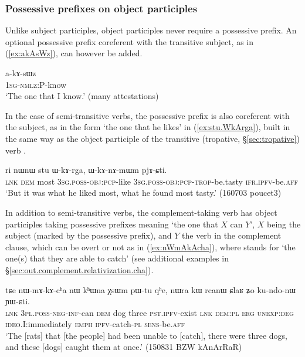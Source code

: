 \subsubsection{Possessive prefixes on object participles}  \label{sec:object.participle.possessive} 
Unlike subject participles, object participles never require a possessive prefix. An optional possessive prefix coreferent with the transitive subject, as in (\ref{ex:akAsWz}), can however be added.
  
  \begin{exe}
\ex \label{ex:akAsWz}
\gll a-kɤ-sɯz    \\
   \textsc{1sg}-\textsc{nmlz}:P-know \\
 \glt  `The one that I know.' (many attestations)
 \end{exe}

In the case of semi-transitive verbs, the possessive prefix is also coreferent with the subject, as in the form  `the one that he likes' in (\ref{ex:stu.WkArga}), built in the same way as the object participle of the transitive (tropative, §\ref{sec:tropative}) verb .

\begin{exe}
\ex \label{ex:stu.WkArga}
\gll ri nɯnɯ stu ɯ-kɤ-rga, ɯ-kɤ-nɤ-mɯm pjɤ-ɕti. \\
\textsc{lnk} \textsc{dem}  most \textsc{3sg}.\textsc{poss}-\textsc{obj}:\textsc{pcp}-like \textsc{3sg}.\textsc{poss}-\textsc{obj}:\textsc{pcp}-\textsc{trop}-be.tasty \textsc{ifr}.\textsc{ipfv}-be.\textsc{aff} \\
\glt `But it was what he liked most, what he found most tasty.' (160703 poucet3) 
\end{exe}

In addition to semi-transitive verbs, the com\-ple\-ment-taking verb  has object participles taking possessive prefixes meaning `the one that $X$ can $Y$', $X$ being the subject (marked by the possessive prefix), and $Y$ the verb in the complement clause, which can be overt or not as in (\ref{ex:nWmAkAcha}), where  stands for  `the one(s) that they are able to catch' (see additional examples in §\ref{sec:out.complement.relativization.cha}).
 
\begin{exe}
\ex  \label{ex:nWmAkAcha}
\gll tɕe nɯ-mɤ-kɤ-cʰa nɯ kʰɯna χsɯm pɯ-tu qʰe, nɯra kɯ rcanɯ ɕlaʁ ʑo ku-ndo-nɯ ɲɯ-ɕti. \\
\textsc{lnk} \textsc{3pl}.\textsc{poss}-\textsc{neg}-\textsc{inf}-can \textsc{dem} dog three \textsc{pst}.\textsc{ipfv}-exist \textsc{lnk} \textsc{dem}:\textsc{pl} \textsc{erg} \textsc{unexp}:\textsc{deg} \textsc{ideo}.I:immediately \textsc{emph} \textsc{ipfv}-catch-\textsc{pl} \textsc{sens}-be.\textsc{aff} \\
\glt `The [rats] that [the people] had been unable to [catch], there were three dogs, and these [dogs] caught them at once.' (150831 BZW kAnArRaR)
\end{exe}

